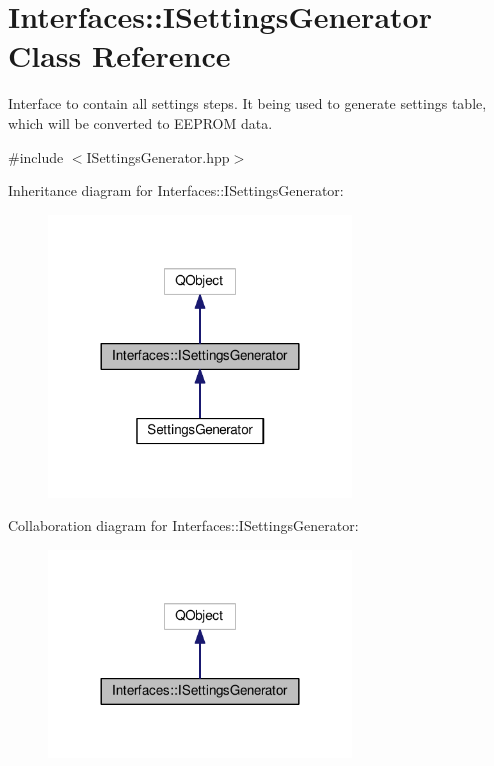 \hypertarget{class_interfaces_1_1_i_settings_generator}{}\section{Interfaces\+:\+:I\+Settings\+Generator Class Reference}
\label{class_interfaces_1_1_i_settings_generator}


Interface to contain all settings steps. It being used to generate settings table, which will be converted to E\+E\+P\+R\+OM data.  




{\ttfamily \#include $<$I\+Settings\+Generator.\+hpp$>$}



Inheritance diagram for Interfaces\+:\+:I\+Settings\+Generator\+:\nopagebreak
\begin{figure}[H]
\begin{center}
\leavevmode
\includegraphics[width=228pt]{class_interfaces_1_1_i_settings_generator__inherit__graph}
\end{center}
\end{figure}


Collaboration diagram for Interfaces\+:\+:I\+Settings\+Generator\+:\nopagebreak
\begin{figure}[H]
\begin{center}
\leavevmode
\includegraphics[width=228pt]{class_interfaces_1_1_i_settings_generator__coll__graph}
\end{center}
\end{figure}
